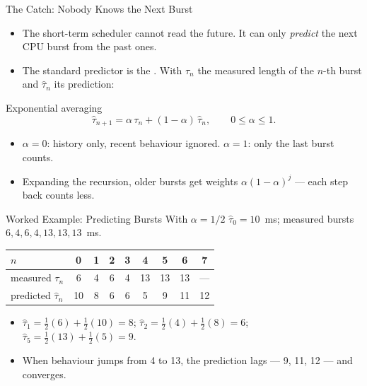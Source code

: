 \documentclass[aspectratio=169]{beamer}
\begin{document}
\begin{frame}{The Catch: Nobody Knows the Next Burst}
  \begin{itemize}
    \item The short-term scheduler cannot read the future. It can only
      \emph{predict} the next CPU burst from the past ones.
    \item The standard predictor is the . With
      $\tau_n$ the measured length of the $n$-th burst and
      $\hat{\tau}_n$ its prediction:
  \end{itemize}
  \begin{block}{Exponential averaging}
    \[
      \hat{\tau}_{n+1} = \alpha\,\tau_n + (1-\alpha)\,\hat{\tau}_n ,
      \qquad 0 \le \alpha \le 1 .
    \]
  \end{block}
  \begin{itemize}
    \item $\alpha = 0$: history only, recent behaviour ignored.
      $\alpha = 1$: only the last burst counts.
    \item Expanding the recursion, older bursts get weights $\alpha(1-\alpha)^j$
      --- each step back counts less.
  \end{itemize}
\end{frame}

\begin{frame}{Worked Example: Predicting Bursts With $\alpha = 1/2$}
  \centering
  \footnotesize
  $\hat{\tau}_0 = 10$~ms; measured bursts $6, 4, 6, 4, 13, 13, 13$~ms.\\[0.25cm]
  \renewcommand{\arraystretch}{1.25}
  \begin{tabular}{lcccccccc}
    \toprule
    $n$ & 0 & 1 & 2 & 3 & 4 & 5 & 6 & 7 \\
    \midrule
    measured $\tau_n$ & 6 & 4 & 6 & 4 & 13 & 13 & 13 & --- \\
    predicted $\hat{\tau}_n$ & 10 & 8 & 6 & 6 & 5 & 9 & 11 & 12 \\
    \bottomrule
  \end{tabular}
  \vspace{0.25cm}
  \begin{itemize}
    \item $\hat{\tau}_1 = \tfrac12(6) + \tfrac12(10) = 8$;
      $\hat{\tau}_2 = \tfrac12(4) + \tfrac12(8) = 6$;
      $\hat{\tau}_5 = \tfrac12(13) + \tfrac12(5) = 9$.
    \item When behaviour jumps from 4 to 13, the prediction lags --- 9, 11,
      12 --- and converges.
  \end{itemize}
\end{frame}
\end{document}
